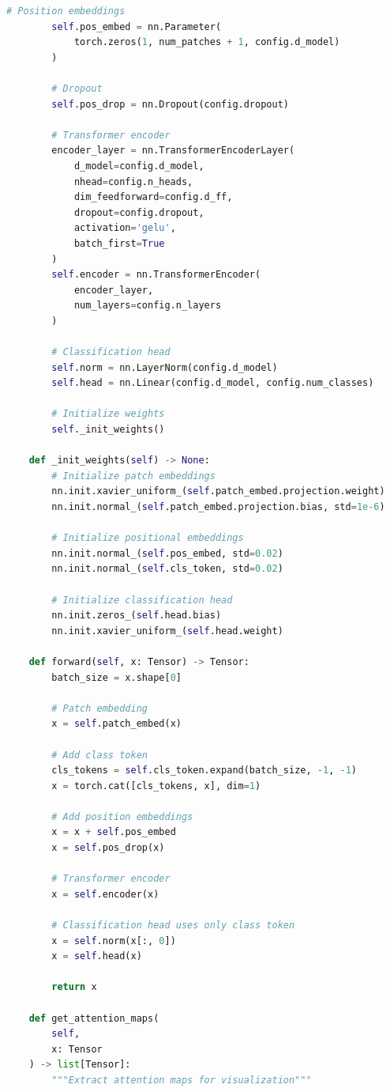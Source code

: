 \begin{lstlisting}[language=Python, caption=Vision Transformer Implementation]
        # Position embeddings
        self.pos_embed = nn.Parameter(
            torch.zeros(1, num_patches + 1, config.d_model)
        )

        # Dropout
        self.pos_drop = nn.Dropout(config.dropout)

        # Transformer encoder
        encoder_layer = nn.TransformerEncoderLayer(
            d_model=config.d_model,
            nhead=config.n_heads,
            dim_feedforward=config.d_ff,
            dropout=config.dropout,
            activation='gelu',
            batch_first=True
        )
        self.encoder = nn.TransformerEncoder(
            encoder_layer,
            num_layers=config.n_layers
        )

        # Classification head
        self.norm = nn.LayerNorm(config.d_model)
        self.head = nn.Linear(config.d_model, config.num_classes)

        # Initialize weights
        self._init_weights()

    def _init_weights(self) -> None:
        # Initialize patch embeddings
        nn.init.xavier_uniform_(self.patch_embed.projection.weight)
        nn.init.normal_(self.patch_embed.projection.bias, std=1e-6)

        # Initialize positional embeddings
        nn.init.normal_(self.pos_embed, std=0.02)
        nn.init.normal_(self.cls_token, std=0.02)

        # Initialize classification head
        nn.init.zeros_(self.head.bias)
        nn.init.xavier_uniform_(self.head.weight)

    def forward(self, x: Tensor) -> Tensor:
        batch_size = x.shape[0]

        # Patch embedding
        x = self.patch_embed(x)

        # Add class token
        cls_tokens = self.cls_token.expand(batch_size, -1, -1)
        x = torch.cat([cls_tokens, x], dim=1)

        # Add position embeddings
        x = x + self.pos_embed
        x = self.pos_drop(x)

        # Transformer encoder
        x = self.encoder(x)

        # Classification head uses only class token
        x = self.norm(x[:, 0])
        x = self.head(x)

        return x

    def get_attention_maps(
        self,
        x: Tensor
    ) -> list[Tensor]:
        """Extract attention maps for visualization"""


\end{lstlisting}
